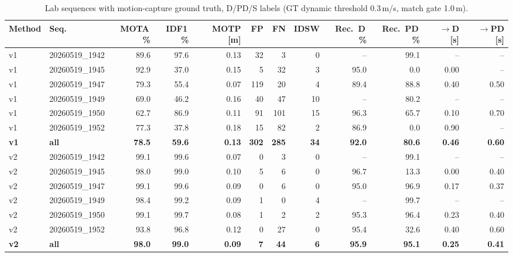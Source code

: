 \begin{table}[t]
\centering
\caption{Lab sequences with motion-capture ground truth, D/PD/S labels (GT dynamic threshold 0.3\,m/s, match gate 1.0\,m).}
\label{tab:own_r9b_full}
\setlength{\tabcolsep}{3pt}
\begin{tabular}{llrrrrrrrrrr}
\toprule
Method & Seq. & MOTA\,\% & IDF1\,\% & MOTP [m] & FP & FN & IDSW & Rec.\ D\,\% & Rec.\ PD\,\% & $\to$D [s] & $\to$PD [s] \\
\midrule
v1 & 20260519\_1942 & 89.6 & 97.6 & 0.13 & 32 & 3 & 0 & -- & 99.1 & -- & -- \\
v1 & 20260519\_1945 & 92.9 & 37.0 & 0.15 & 5 & 32 & 3 & 95.0 & 0.0 & 0.00 & -- \\
v1 & 20260519\_1947 & 79.3 & 55.4 & 0.07 & 119 & 20 & 4 & 89.4 & 88.8 & 0.40 & 0.50 \\
v1 & 20260519\_1949 & 69.0 & 46.2 & 0.16 & 40 & 47 & 10 & -- & 80.2 & -- & -- \\
v1 & 20260519\_1950 & 62.7 & 86.9 & 0.11 & 91 & 101 & 15 & 96.3 & 65.7 & 0.10 & 0.70 \\
v1 & 20260519\_1952 & 77.3 & 37.8 & 0.18 & 15 & 82 & 2 & 86.9 & 0.0 & 0.90 & -- \\
\textbf{v1} & \textbf{all} & \textbf{78.5} & \textbf{59.6} & \textbf{0.13} & \textbf{302} & \textbf{285} & \textbf{34} & \textbf{92.0} & \textbf{80.6} & \textbf{0.46} & \textbf{0.60} \\
\midrule
v2 & 20260519\_1942 & 99.1 & 99.6 & 0.07 & 0 & 3 & 0 & -- & 99.1 & -- & -- \\
v2 & 20260519\_1945 & 98.0 & 99.0 & 0.10 & 5 & 6 & 0 & 96.7 & 13.3 & 0.00 & 0.40 \\
v2 & 20260519\_1947 & 99.1 & 99.6 & 0.09 & 0 & 6 & 0 & 95.0 & 96.9 & 0.17 & 0.37 \\
v2 & 20260519\_1949 & 98.4 & 99.2 & 0.09 & 1 & 0 & 4 & -- & 99.7 & -- & -- \\
v2 & 20260519\_1950 & 99.1 & 99.7 & 0.08 & 1 & 2 & 2 & 95.3 & 96.4 & 0.23 & 0.40 \\
v2 & 20260519\_1952 & 93.8 & 96.8 & 0.12 & 0 & 27 & 0 & 95.4 & 32.6 & 0.40 & 0.60 \\
\textbf{v2} & \textbf{all} & \textbf{98.0} & \textbf{99.0} & \textbf{0.09} & \textbf{7} & \textbf{44} & \textbf{6} & \textbf{95.9} & \textbf{95.1} & \textbf{0.25} & \textbf{0.41} \\
\bottomrule
\end{tabular}
\end{table}
